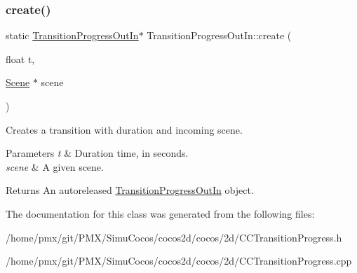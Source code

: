 \subsubsection{\texorpdfstring{create()}{create()}\hspace{0.1cm}{\footnotesize\ttfamily [2/2]}}
{\footnotesize\ttfamily static \hyperlink{classTransitionProgressOutIn}{Transition\+Progress\+Out\+In}$\ast$ Transition\+Progress\+Out\+In\+::create (\begin{DoxyParamCaption}\item[{float}]{t,  }\item[{\hyperlink{classScene}{Scene} $\ast$}]{scene }\end{DoxyParamCaption})\hspace{0.3cm}{\ttfamily [static]}}

Creates a transition with duration and incoming scene.


\begin{DoxyParams}{Parameters}
{\em t} & Duration time, in seconds. \\
\hline
{\em scene} & A given scene. \\
\hline
\end{DoxyParams}
\begin{DoxyReturn}{Returns}
An autoreleased \hyperlink{classTransitionProgressOutIn}{Transition\+Progress\+Out\+In} object. 
\end{DoxyReturn}


The documentation for this class was generated from the following files\+:\begin{DoxyCompactItemize}
\item 
/home/pmx/git/\+P\+M\+X/\+Simu\+Cocos/cocos2d/cocos/2d/C\+C\+Transition\+Progress.\+h\item 
/home/pmx/git/\+P\+M\+X/\+Simu\+Cocos/cocos2d/cocos/2d/C\+C\+Transition\+Progress.\+cpp\end{DoxyCompactItemize}
